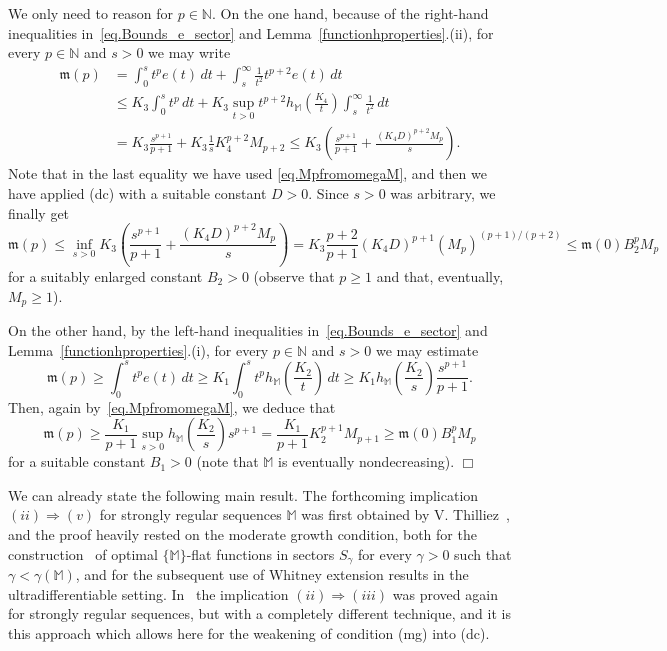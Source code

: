 \documentclass[11pt,a4paper]{article}
\theoremstyle{plain}
\theoremstyle{definition}
\newenvironment{proof1}{\medskip\par\noindent{\bf Proof.}}{\hfill $\Box$
\medskip\par}
\newcommand{\N}{\mathbb{N}}
\newcommand{\M}{\mathbb{M}}
\newcommand{\mo}{\mathfrak{m}}
\def\ga{\gamma}
\begin{document}
\begin{proof1}
We only need to reason for $p\in\N$.
On the one hand, because of the right-hand inequalities in~\eqref{eq.Bounds_e_sector} and Lemma~\ref{functionhproperties}.(ii), for every $p\in\N$ and $s>0$ we may write
\begin{align*}
\mo(p)&=\int_0^s t^p e(t)\,dt
+\int_s^\infty \frac{1}{t^2}t^{p+2}e(t)\,dt\\%
&\le K_3 \int_0^s t^p\,dt + K_3\sup_{t>0}t^{p+2}h_\M\left(\frac{K_4}{t}\right)\int_s^\infty \frac{1}{t^2}\,dt \\%
&= K_3 \frac{s^{p+1}}{p+1}
+K_3\frac{1}{s}K_4^{p+2}M_{p+2}
\le K_3 \left(\frac{s^{p+1}}{p+1}
+\frac{(K_4D)^{p+2}M_{p}}{s}\right).
\end{align*}
Note that in the last equality we have used \eqref{eq.MpfromomegaM}, and then we have applied (dc) with a suitable constant $D>0$.
Since $s>0$ was arbitrary, we finally get
\begin{equation*}
\mo(p)\le \inf_{s>0}K_3 \left(\frac{s^{p+1}}{p+1}
+\frac{(K_4D)^{p+2}M_{p}}{s}\right)= K_3\frac{p+2}{p+1}(K_4D)^{p+1}(M_{p})^{(p+1)/(p+2)}
\le \mo(0)B_2^pM_p
\end{equation*}
for a suitably enlarged constant $B_2>0$ (observe that $p\ge 1$ and that, eventually, $M_p\ge 1$).

On the other hand, by the left-hand inequalities in~\eqref{eq.Bounds_e_sector} and Lemma~\ref{functionhproperties}.(i), for every $p\in\N$ and $s>0$ we may estimate
$$
\mo(p)\ge \int_0^s t^p e(t)\,dt \ge K_1 \int_0^s t^p h_{\M}\left(\frac{K_2}{t}\right)\,dt\ge
K_1 h_{\M}\left(\frac{K_2}{s}\right)\frac{s^{p+1}}{p+1}.
$$
Then, again by~\eqref{eq.MpfromomegaM}, we deduce that
$$
\mo(p)\ge \frac{K_1}{p+1} \sup_{s>0}h_{\M}\left(\frac{K_2}{s}\right)s^{p+1}=
\frac{K_1}{p+1} K_2^{p+1}M_{p+1}\ge
\mo(0)B_1^p M_p
$$
for a suitable constant $B_1>0$ (note that $\M$ is eventually nondecreasing).
\end{proof1}


We can already state the following main result. The forthcoming implication $(ii)\Rightarrow(v)$ for strongly regular sequences $\M$ was first obtained by V. Thilliez~\cite[Th.~3.2.1]{Thilliez03}, and the proof heavily rested on the moderate growth condition,
both for the  construction~\cite[Th.~2.3.1]{Thilliez03} of optimal $\{\M\}$-flat functions in sectors $S_{\ga}$ for every $\ga>0$ such that $\ga<\ga(\M)$, and for the subsequent use
of Whitney extension results in the ultradifferentiable setting.
In~\cite{LastraMalekSanzContinuousRightLaplace} the implication $(ii)\Rightarrow(iii)$ was proved again for strongly regular sequences, but with a completely different technique, and it is this approach which allows here for the weakening of condition (mg) into (dc).
\end{document}
